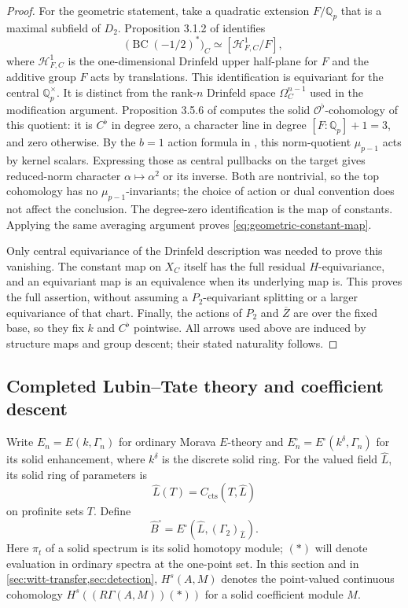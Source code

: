 \documentclass[11pt]{article}
\numberwithin{equation}{section}
\theoremstyle{definition}
\theoremstyle{remark}
\begin{document}
\begin{proof}
For the geometric statement, take a quadratic extension $F/\mathbb Q_p$ that
is a maximal subfield of $D_2$.  Proposition 3.1.2 of \cite{BMR2026}
identifies
\[
 \bigl(\operatorname{BC}(-1/2)^*\bigr)_C
 \simeq[\mathcal H^1_{F,C}/F],
\]
where $\mathcal H^1_{F,C}$ is the one-dimensional Drinfeld upper
half-plane for $F$ and the additive group $F$ acts by translations.
This identification is equivariant for the central $\mathbb Q_p^{\times}$.
It is distinct from the rank-$n$ Drinfeld space
$\Omega_C^{n-1}$ used in the modification argument.
Proposition 3.5.6 of \cite{BMR2026} computes the solid
$\mathcal O^{\flat}$-cohomology of this quotient: it is $C^{\flat}$ in degree
zero, a character line in degree $[F:\mathbb Q_p]+1=3$, and zero otherwise.
By the $b=1$ action formula in , this norm-quotient
$\mu_{p-1}$ acts by kernel scalars.  Expressing those as central
pullbacks on the target gives reduced-norm character
$\alpha\mapsto\alpha^2$ or its inverse.  Both are nontrivial, so the
top cohomology has no $\mu_{p-1}$-invariants; the choice of action or
dual convention does not affect the conclusion.
The degree-zero identification is the map of constants.  Applying the
same averaging argument proves \eqref{eq:geometric-constant-map}.

Only central equivariance of the Drinfeld description was needed to
prove this vanishing.  The constant map on $X_C$ itself has the full
residual $H$-equivariance, and an equivariant map is an equivalence when
its underlying map is.  This proves the full assertion, without assuming
a $P_2$-equivariant splitting or a larger equivariance of that chart.
Finally, the actions of $P_2$ and $\overline Z$ are over the fixed base,
so they fix $k$ and $C^{\flat}$ pointwise.  All arrows used above are
induced by structure maps and group descent; their stated naturality
follows.
\end{proof}

\subsection{Completed Lubin--Tate theory and coefficient descent}

Write $E_n=E(k,\Gamma_n)$ for ordinary Morava $E$-theory and
$E_n^{\square}=E^{\square}(k^{\delta},\Gamma_n)$ for its solid
enhancement, where $k^{\delta}$ is the discrete solid ring.  For the
valued field $\widehat L$, its solid ring of parameters is
\[
 \widehat L(T)=C_{\mathrm{cts}}(T,\widehat L)
\]
on profinite sets $T$.  Define
\[
 \widehat B^{\square}
   =E^{\square}(\widehat L,(\Gamma_2)_{\widehat L}).
\]
Here $\pi_t$ of a solid spectrum is its solid homotopy module; $(*)$
will denote evaluation in ordinary spectra at the one-point set.
In this section and in \cref{sec:witt-transfer,sec:detection},
$H^s(A,M)$ denotes the point-valued continuous cohomology
$H^s((R\Gamma(A,M))(*))$ for a solid coefficient module $M$.
\end{document}
